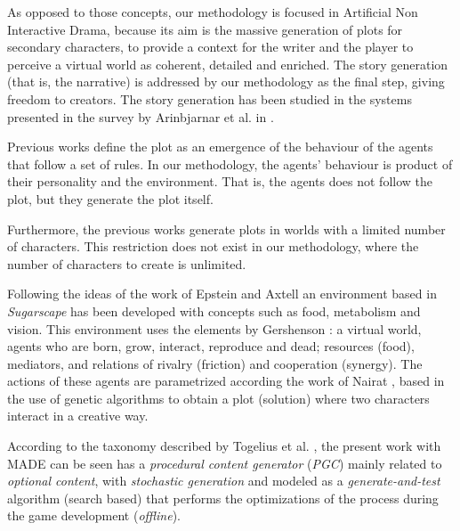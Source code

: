 \documentclass{sig-alternate}
\begin{document}
As opposed to those concepts, our methodology is focused in Artificial Non
Interactive Drama, because its aim is the massive generation of plots
for secondary characters, to provide a context for the writer and the
player to perceive a virtual world as coherent, detailed and
enriched. The story generation (that is, the narrative) is addressed 
by our methodology as the final step, giving freedom to creators. The story generation has been studied in the systems presented in
the survey by Arinbjarnar et al. in \cite{ReviewArinbjarnar09}. 


Previous works define the plot as an emergence of the behaviour of the agents that follow a set of rules. In our methodology, the agents' behaviour is product of their personality and the environment. That is, the agents does not follow the plot, but they generate the plot itself.


Furthermore, the previous works generate plots in worlds with a limited number of characters. This restriction does not exist in our methodology, where the number of characters to create is unlimited.



Following the ideas of the work of Epstein and Axtell
\cite{epstein1996growing} an environment based in {\em Sugarscape} has
been developed with concepts such as food, metabolism and
vision. This environment uses the elements by Gershenson
\cite{gershenson2005general}: a virtual world, agents who are born, grow, 
interact, reproduce and dead; resources (food), mediators, and
relations of rivalry (friction) and cooperation (synergy). The actions
of these agents are parametrized according the work of Nairat
\cite{nairat2011character}, based in the use of genetic algorithms to
obtain a plot (solution) where two characters interact in a creative way.

According to the taxonomy described by Togelius et al. \cite{Togelius2011}, the present work
with MADE can be seen has a \textit{procedural content generator} (\textit{PGC})
mainly related to \textit{optional content}, with \textit{stochastic generation}
and modeled as a \textit{generate-and-test} algorithm (search based) that
performs the optimizations of the process during the game development (\textit{offline}).

\end{document}
